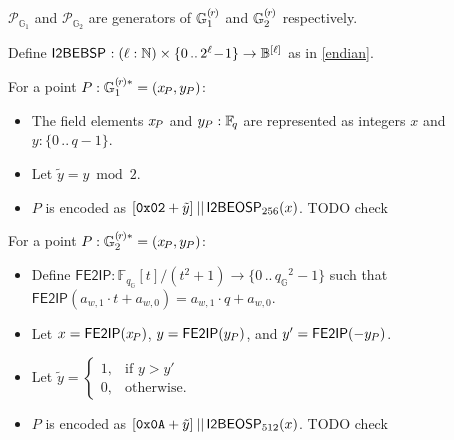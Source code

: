 \documentclass{article}
\newcommand{\crossref}[1]{\autoref{#1}}
\newcommand{\typecolon}{:}
\newcommand{\bit}{\mathbb{B}}
\newcommand{\Nat}{\mathbb{N}}
\newcommand{\Field}[1]{\mathbb{F}_{\!#1}}
\newcommand{\typeexp}[2]{{#1}\vphantom{)}^{[{#2}]}}
\newcommand{\bitseq}[1]{\typeexp{\bit}{#1}}
\newcommand{\bconcat}{\mathop{\kern 0.05em||}}
\newcommand{\squash}{\!\!\!}
\newcommand{\caseif}{\squash\text{if }}
\newcommand{\caseotherwise}{\squash\text{otherwise}}
\newcommand{\hexint}[1]{\mathtt{0x{#1}}}
\newcommand{\setof}[1]{\{{#1}\}}
\newcommand{\barerange}[2]{{{#1}\,..\,{#2}}}
\newcommand{\range}[2]{\setof{\barerange{#1}{#2}}}
\newcommand{\binaryrange}[1]{\range{0}{2^{#1}\!-\!1}}
\newcommand{\mult}{\cdot}
\newcommand{\Generator}{\mathcal{P}}
\newcommand{\subgroupr}{(\kern-0.075emr\kern-0.075em)}
\newcommand{\ParamG}[1]{{{#1}_\mathbb{G}}}
\newcommand{\ParamGexp}[2]{{{#1}_\mathbb{G}\!}^{#2}}
\newcommand{\GroupG}[1]{\mathbb{G}_{#1}}
\newcommand{\SubgroupG}[1]{\GroupG{#1}^{\subgroupr}}
\newcommand{\SubgroupGstar}[1]{\GroupG{#1}^{\subgroupr\ast}}
\newcommand{\GenG}[1]{\Generator_{\GroupG{#1}}}
\newcommand{\xP}{{x_{\hspace{-0.12em}P}}}
\newcommand{\yP}{{y_{\hspace{-0.03em}P}}}
\newcommand{\FEtoIP}{\mathsf{FE2IP}}
\newcommand{\ItoBEBSP}[1]{\mathsf{I2BEBSP}_{#1}}
\newcommand{\ItoBEOSP}[1]{\mathsf{I2BEOSP}_{#1}}
\begin{document}
$\GenG{1}$ and $\GenG{2}$ are generators of $\SubgroupG{1}$ and $\SubgroupG{2}$ respectively.

Define $\ItoBEBSP{} \typecolon (\ell \typecolon \Nat) \times \binaryrange{\ell} \rightarrow
\bitseq{\ell}$ as in \crossref{endian}.

For a point $P \typecolon \SubgroupGstar{1} = (\xP, \yP)$:

\begin{itemize}
  \item The field elements $\xP$ and $\yP \typecolon \Field{q}$ are represented as
        integers $x$ and $y \typecolon \range{0}{q\!-\!1}$.
  \item Let $\tilde{y} = y \bmod 2$.
  \item $P$ is encoded as $[\hexint{02} + \tilde{y}] \bconcat \ItoBEOSP{256}(x)$. TODO check
\end{itemize}

For a point $P \typecolon \SubgroupGstar{2} = (\xP, \yP)$:

\begin{itemize}
  \item Define $\FEtoIP \typecolon \Field{\ParamG{q}}[t] / (t^2 + 1) \rightarrow
          \range{0}{\ParamGexp{q}{2}\!-\!1}$ such that
        $\FEtoIP(a_{w,1} \mult t + a_{w,0}) = a_{w,1} \mult q + a_{w,0}$.
  \item Let $x = \FEtoIP(\xP)$, $y = \FEtoIP(\yP)$, and $y' = \FEtoIP(-\yP)$.
  \item Let $\tilde{y} = \begin{cases}
          1, &\caseif y > y' \\
          0, &\caseotherwise.
        \end{cases}$
  \item $P$ is encoded as $[\hexint{0A} + \tilde{y}] \bconcat \ItoBEOSP{512}(x)$. TODO check
\end{itemize}
\end{document}
